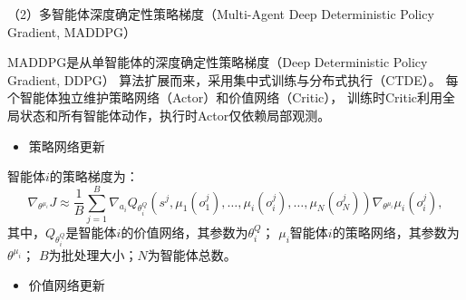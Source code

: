 （2）多智能体深度确定性策略梯度（Multi-Agent Deep Deterministic Policy Gradient, MADDPG）

MADDPG是从单智能体的深度确定性策略梯度（Deep Deterministic Policy Gradient, DDPG）
算法扩展而来，采用集中式训练与分布式执行（CTDE）。
每个智能体独立维护策略网络（Actor）和价值网络（Critic），
训练时Critic利用全局状态和所有智能体动作，执行时Actor仅依赖局部观测。

\begin{itemize}
    \item 策略网络更新
\end{itemize}

智能体\(i\)的策略梯度为：
\begin{equation}\label{式2-10}
    \nabla_{\theta^{\mu_i}} J \approx \frac{1}{B} \sum_{j=1}^B \nabla_{a_i} Q_{\theta^Q_i}\left(s^j, \mu_1(o_1^j), \dots, \mu_i(o_i^j), \dots, \mu_N(o_N^j) \right) \nabla_{\theta^{\mu_i}} \mu_i(o_i^j),
\end{equation}
其中，$Q_{\theta^Q_i}$是智能体$i$的价值网络，其参数为$\theta^Q_i$；
$\mu_i$智能体$i$的策略网络，其参数为$\theta^{\mu_i}$；
\(B\)为批处理大小；\(N\)为智能体总数。


\begin{itemize}
    \item 价值网络更新
\end{itemize}

